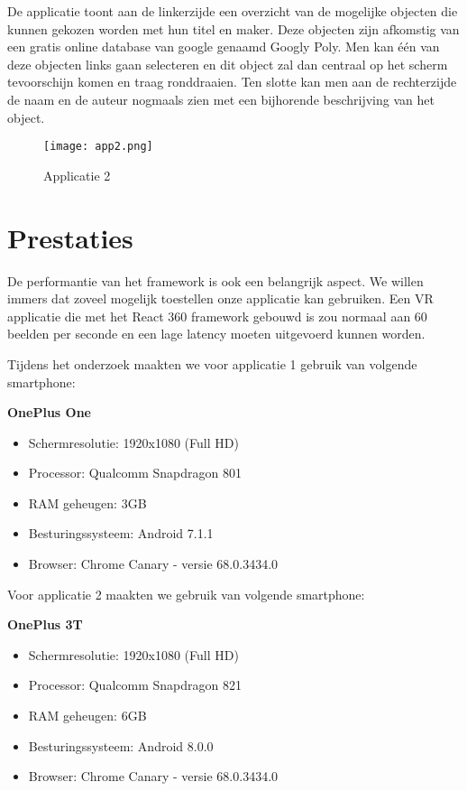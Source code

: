 De applicatie toont aan de linkerzijde een overzicht van de mogelijke objecten die kunnen gekozen worden met hun titel en maker. Deze objecten zijn afkomstig van een gratis online database van google genaamd Googly Poly. Men kan één van deze objecten links gaan selecteren en dit object zal dan centraal op het scherm tevoorschijn komen en traag ronddraaien. Ten slotte kan men aan de rechterzijde de naam en de auteur nogmaals zien met een bijhorende beschrijving van het object.

\begin{figure}[H]
	\centering
	\texttt{[image: app2.png]}
	\caption{Applicatie 2}
	\label{fig:app2}
\end{figure}

\section{Prestaties}
\label{sec:prestaties}
De performantie van het framework is ook een belangrijk aspect. We willen immers dat zoveel mogelijk toestellen onze applicatie kan gebruiken. Een VR applicatie die met het React 360 framework gebouwd is zou normaal aan 60 beelden per seconde en een lage latency moeten uitgevoerd kunnen worden.

Tijdens het onderzoek maakten we voor applicatie 1 gebruik van volgende smartphone:

\textbf{OnePlus One }
\begin{itemize}
	\item Schermresolutie: 1920x1080 (Full HD)
	\item Processor: Qualcomm Snapdragon 801
	\item RAM geheugen: 3GB
	\item Besturingssysteem: Android 7.1.1
	\item Browser: Chrome Canary - versie 68.0.3434.0
\end{itemize}

Voor applicatie 2 maakten we gebruik van volgende smartphone:

\textbf{OnePlus 3T}
\begin{itemize}
	\item Schermresolutie: 1920x1080 (Full HD)
	\item Processor: Qualcomm Snapdragon 821
	\item RAM geheugen: 6GB
	\item Besturingssysteem: Android 8.0.0
	\item Browser: Chrome Canary - versie 68.0.3434.0
\end{itemize}

